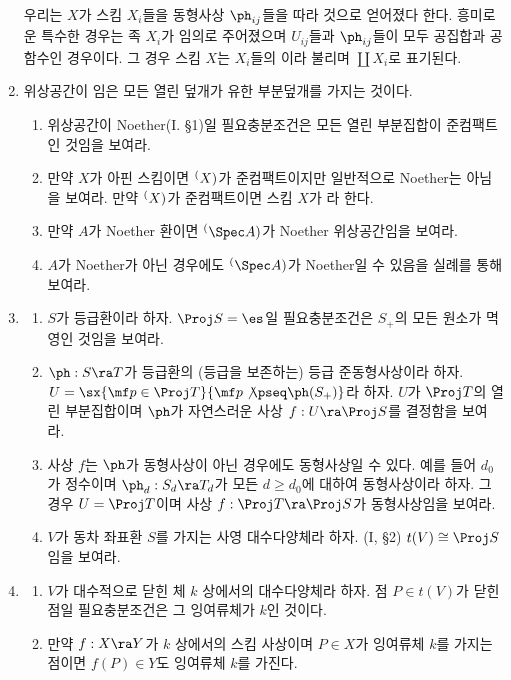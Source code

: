 \begin{enumerate}[label=\tb{2.\arabic*.},itemindent=0mm,itemsep=2mm]
	우리는 $X$가 스킴 $X_i$들을 동형사상 $\ph_{ij}$들을 따라  것으로 얻어졌다 한다.
	흥미로운 특수한 경우는 족 $X_i$가 임의로 주어졌으며 $U_{ij}$들과 $\ph_{ij}$들이 모두 공집합과 공함수인 경우이다.
	그 경우 스킴 $X$는 $X_i$들의 이라 불리며 $\coprod X_i$로 표기된다.
	\item 위상공간이 임은 모든 열린 덮개가 유한 부분덮개를 가지는 것이다.
	\begin{enumerate}[label=(\alph*)]
	\item 위상공간이 Noether(I. \S 1)일 필요충분조건은 모든 열린 부분집합이 준컴팩트인 것임을 보여라.
	\item 만약 $X$가 아핀 스킴이면 $\sp(X)$가 준컴팩트이지만 일반적으로 Noether는 아님을 보여라.
	만약 $\sp(X)$가 준컴팩트이면 스킴 $X$가 라 한다.
	\item 만약 $A$가 Noether 환이면 $\sp(\Spec A)$가 Noether 위상공간임을 보여라.
	\item $A$가 Noether가 아닌 경우에도 $\sp(\Spec A)$가 Noether일 수 있음을 실례를 통해 보여라.
	\end{enumerate}
	\item \begin{enumerate}[label=(\alph*)]
	\item $S$가 등급환이라 하자. $\Proj S=\es$일 필요충분조건은 $S_+$의 모든 원소가 멱영인 것임을 보여라.
	\item $\ph:S\ra T$가 등급환의 (등급을 보존하는) 등급 준동형사상이라 하자.
	$U=\sx{\mf p\in\Proj T}{\mf p\not\pseq\ph(S_+)}$라 하자.
	$U$가 $\Proj T$의 열린 부분집합이며 $\ph$가 자연스러운 사상 $f:U\ra\Proj S$를 결정함을 보여라.
	\item 사상 $f$는 $\ph$가 동형사상이 아닌 경우에도 동형사상일 수 있다.
	예를 들어 $d_0$가 정수이며 $\ph_d:S_d\ra T_d$가 모든 $d\ge d_0$에 대하여 동형사상이라 하자.
	그 경우 $U=\Proj T$이며 사상 $f:\Proj T\ra\Proj S$가 동형사상임을 보여라.
	\item $V$가 동차 좌표환 $S$를 가지는 사영 대수다양체라 하자. (I, \S 2) $t(V)\cong\Proj S$임을 보여라.
	\end{enumerate}
	\item \begin{enumerate}[label=(\alph*)]
	\item $V$가 대수적으로 닫힌 체 $k$ 상에서의 대수다양체라 하자. 점 $P\in t(V)$가 닫힌점일 필요충분조건은 그 잉여류체가 $k$인 것이다.
	\item 만약 $f:X\ra Y$가 $k$ 상에서의 스킴 사상이며 $P\in X$가 잉여류체 $k$를 가지는 점이면 $f(P)\in Y$도 잉여류체 $k$를 가진다.

\end{enumerate}
\end{enumerate}
